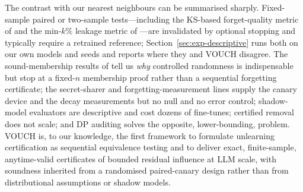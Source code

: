 The contrast with our nearest neighbours can be summarised sharply. Fixed-sample
paired or two-sample tests---including the KS-based forget-quality metric of
\citet{maini2024tofu} and the min-$k\%$ leakage metric of \citet{shi2024muse}---are
invalidated by optional stopping and typically require a retrained reference;
Section~\ref{sec:exp-descriptive} runs both on our own models and seeds and reports
where they and VOUCH disagree. The sound-membership results of \citet{zhang2024mia}
tell us \emph{why} controlled randomness is indispensable but stop at a fixed-$n$
membership proof rather than a sequential forgetting certificate; the secret-sharer
and forgetting-measurement lines \citep{carlini2019secret,jagielski2023measuring}
supply the canary device and the decay measurements but no null and no error control;
shadow-model evaluators \citep{hayes2024inexact} are descriptive and cost dozens of
fine-tunes; certified removal \citep{guo2020certified,sekhari2021remember} does not
scale; and DP auditing \citep{steinke2023privacy,gonzalez2025sequential} solves the
opposite, lower-bounding, problem. VOUCH is, to our knowledge, the first framework to
formulate unlearning certification as sequential equivalence testing and to deliver
exact, finite-sample, anytime-valid certificates of bounded residual influence at LLM
scale, with soundness inherited from a randomised paired-canary design rather than
from distributional assumptions or shadow models.
